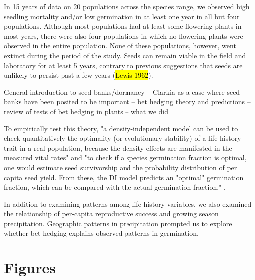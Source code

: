 \documentclass[12pt, oneside, titlepage]{article}   	%
\begin{document}
{In 15 years of data on 20 populations across the species range, we observed high seedling mortality and/or low germination in at least one year in all but four populations. Although most populations had at least some flowering plants in most years, there were also four populations in which no flowering plants were observed in the entire population. None of these populations, however, went extinct during the period of the study. Seeds can remain viable in the field and laboratory for at least 5 years, contrary to previous suggestions that seeds are unlikely to persist past a few years (\hl{Lewis 1962}). 

General introduction to seed banks/dormancy -- Clarkia as a case where seed banks have been posited to be important -- bet hedging theory and predictions -- review of tests of bet hedging in plants -- what we did

To empirically test this theory, "a density-independent model can be used to check quantitatively the optimality (or evolutionary stability) of a life history trait in a real population, because the density effects are manifested in the measured vital rates" and "to check if a species germination fraction is optimal, one would estimate seed survivorship and the probability distribution of per capita seed yield. From these, the DI model predicts an "optimal" germination fraction, which can be compared with the actual germination fraction." \cite{ellner1985a}.


In addition to examining patterns among life-history variables, we also examined the relationship of per-capita reproductive success and growing season precipitation. Geographic patterns in precipitation prompted us to explore whether bet-hedging explains observed patterns in germination.
\fi

\clearpage
\section*{Figures} 

\iffalse


}
\end{document}
